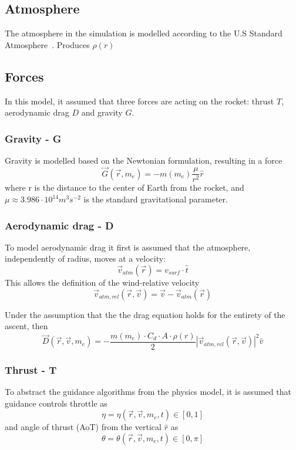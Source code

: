 \documentclass[11pt]{article}
\begin{document}
\subsection{Atmosphere}
The atmosphere in the simulation is modelled according to the U.S Standard Atmosphere~\cite{atmosphere2014}.
%
%
Produces $\rho(r)$

\subsection{Forces}
In this model, it assumed that three forces are acting on the rocket: thrust $T$, aerodynamic drag $D$ and gravity $G$.

\subsubsection{Gravity - G}
Gravity is modelled based on the Newtonian formulation, resulting in a force
$$
\vec{G}(\vec{r}, m_e) = -m(m_e) \frac{\mu}{r^2} \hat{r} 
$$
where r is the distance to the center of Earth from the rocket, and $\mu \approx 3.986\cdot10^{14} m^3 s^{−2}$ is the standard gravitational parameter.

\subsubsection{Aerodynamic drag - D}
% 
%
To model aerodynamic drag it first is assumed that the atmosphere, independently of radius, moves at a velocity:
$$
\vec{v}_{atm} (\vec{r}) = v_{surf} \cdot \hat{t}
$$
This allows the definition of the wind-relative velocity
$$
\vec{v}_{atm,rel} (\vec{r}, \vec{v}) = \vec{v} - \vec{v}_{atm} (\vec{r})
$$

%
%
Under the assumption that the the drag equation holds for the entirety of the ascent, then
$$
\vec{D}(\vec{r}, \vec{v}, m_e) = - \frac{ m(m_e) \cdot  C_d  \cdot A \cdot \rho(r) }{2} {\left| \vec{v}_{atm,rel} (\vec{r}, \vec{v}) \right|}^2 \hat{v}
$$
\subsubsection{Thrust - T}

%
%

To abstract the guidance algorithms from the physics model, it is assumed that guidance controls throttle as
$$
\eta = \eta(\vec{r}, \vec{v}, m_e, t)\in[0,1]
$$
and angle of thrust (AoT) from the vertical $\hat{r}$ as
$$
\theta = \theta(\vec{r}, \vec{v}, m_e, t)\in\left[0,\pi\right]
$$
\end{document}
